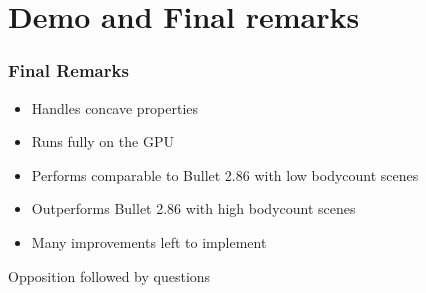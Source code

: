 \documentclass{beamer}
\begin{document}
	\section{Demo and Final remarks}
	\begin{frame}
		\frametitle{Final Remarks}
		\begin{itemize}
			\item Handles concave properties
			\item Runs fully on the GPU
			\item Performs comparable to Bullet 2.86 with low bodycount scenes
			\item Outperforms Bullet 2.86 with high bodycount scenes
			\item Many improvements left to implement
		\end{itemize}
	\end{frame}






	\begin{frame}
		\Huge{\centerline{Opposition followed by questions}}
	\end{frame}

\end{document}
